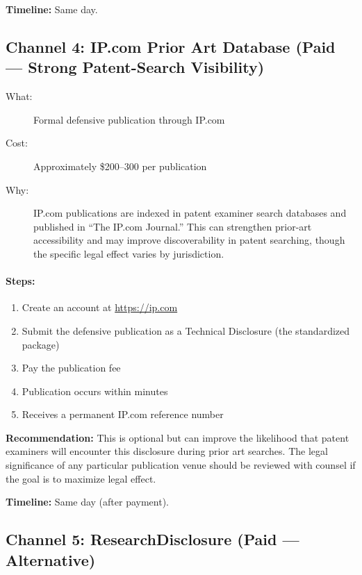 \documentclass[12pt,a4paper]{article}
\begin{document}
\noindent\textbf{Timeline:} Same day.

\subsection{Channel 4: IP.com Prior Art Database (Paid --- Strong Patent-Search Visibility)}

\begin{description}
  \item[What:] Formal defensive publication through IP.com
  \item[Cost:] Approximately \$200--300 per publication
  \item[Why:] IP.com publications are indexed in patent examiner search databases and published in ``The IP.com Journal.'' This can strengthen prior-art accessibility and may improve discoverability in patent searching, though the specific legal effect varies by jurisdiction.
\end{description}

\paragraph{Steps:}
\begin{enumerate}
  \item Create an account at \url{https://ip.com}
  \item Submit the defensive publication as a Technical Disclosure (the standardized package)
  \item Pay the publication fee
  \item Publication occurs within minutes
  \item Receives a permanent IP.com reference number
\end{enumerate}

\noindent\textbf{Recommendation:} This is optional but can improve the likelihood that patent examiners will encounter this disclosure during prior art searches. The legal significance of any particular publication venue should be reviewed with counsel if the goal is to maximize legal effect.

\noindent\textbf{Timeline:} Same day (after payment).

\subsection{Channel 5: ResearchDisclosure (Paid --- Alternative)}
\end{document}
